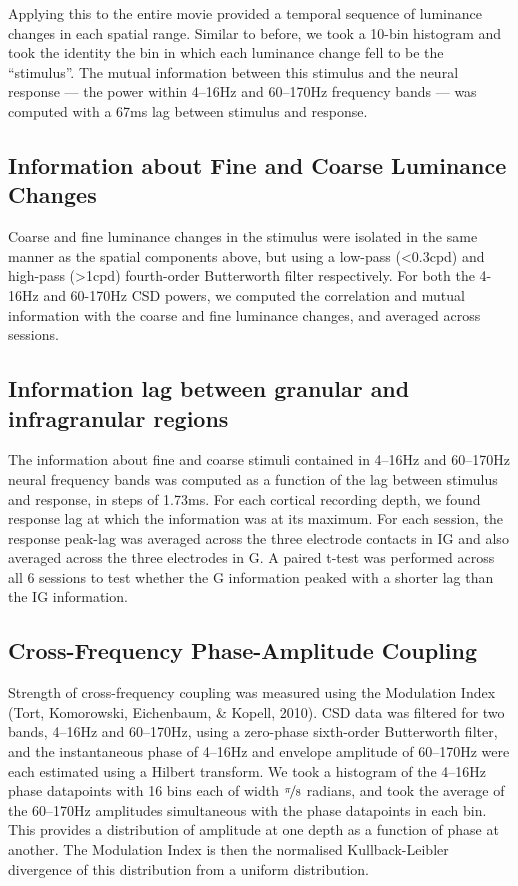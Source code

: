 Applying this to the entire movie provided a temporal sequence of luminance changes in each spatial range. Similar to before, we took a 10-bin histogram and took the identity the bin in which each luminance change fell to be the ``stimulus''. The mutual information between this stimulus and the neural response --- the power within 4--16Hz and 60--170Hz frequency bands --- was computed with a 67ms lag between stimulus and response.

\subsection{Information about Fine and Coarse Luminance Changes}
Coarse and fine luminance changes in the stimulus were isolated in the same manner as the spatial components above, but using a low-pass ({\textless}0.3cpd) and high-pass ({\textgreater}1cpd) fourth-order Butterworth filter respectively. For both the 4-16Hz and 60-170Hz \ac{CSD} powers, we computed the correlation and mutual information with the coarse and fine luminance changes, and averaged across sessions.

\subsection[Information lag between granular and infragranular regions]{Information lag between granular and infragranular regions}
The information about fine and coarse stimuli contained in 4--16Hz and 60--170Hz neural frequency bands was computed as a function of the lag between stimulus and response, in steps of 1.73ms. For each cortical recording depth, we found response lag at which the information was at its maximum. For each session, the response peak-lag was averaged across the three electrode contacts in \ac{IG} and also averaged across the three electrodes in \ac{G}. A paired t-test was performed across all 6 sessions to test whether the \ac{G} information peaked with a shorter lag than the \ac{IG} information.

\subsection{Cross-Frequency Phase-Amplitude Coupling}
Strength of cross-frequency coupling was measured using the Modulation Index (Tort, Komorowski, Eichenbaum, \& Kopell, 2010). \ac{CSD} data was filtered for two bands, 4--16Hz and 60--170Hz, using a zero-phase sixth-order Butterworth filter, and the instantaneous phase of 4--16Hz and envelope amplitude of 60--170Hz were each estimated using a Hilbert transform. We took a histogram of the 4--16Hz phase datapoints with 16 bins each of width $\nicefrac{\pi}{8}$ radians, and took the average of the 60--170Hz amplitudes simultaneous with the phase datapoints in each bin. This provides a distribution of amplitude at one depth as a function of phase at another. The Modulation Index is then the normalised Kullback-Leibler divergence of this distribution from a uniform distribution.

